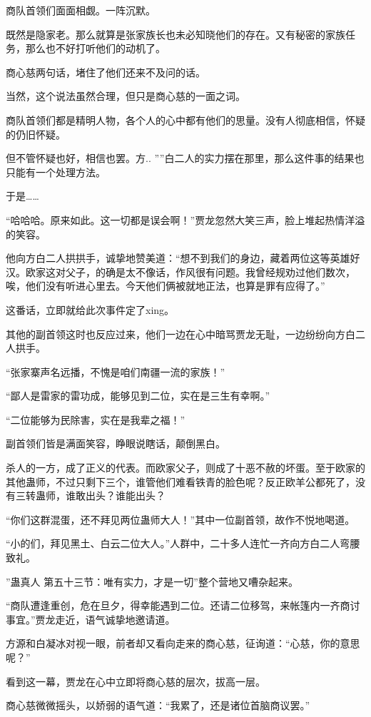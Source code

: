 \begin{this_body}
商队首领们面面相觑。一阵沉默。

既然是隐家老。那么就算是张家族长也未必知晓他们的存在。又有秘密的家族任务，那么也不好打听他们的动机了。

商心慈两句话，堵住了他们还来不及问的话。

当然，这个说法虽然合理，但只是商心慈的一面之词。

商队首领们都是精明人物，各个人的心中都有他们的思量。没有人彻底相信，怀疑的仍旧怀疑。

但不管怀疑也好，相信也罢。方.. ””白二人的实力摆在那里，那么这件事的结果也只能有一个处理方法。

于是……

“哈哈哈。原来如此。这一切都是误会啊！”贾龙忽然大笑三声，脸上堆起热情洋溢的笑容。

他向方白二人拱拱手，诚挚地赞美道：“想不到我们的身边，藏着两位这等英雄好汉。欧家这对父子，的确是太不像话，作风很有问题。我曾经规劝过他们数次，唉，他们没有听进心里去。今天他们俩被就地正法，也算是罪有应得了。”

这番话，立即就给此次事件定了xing。

其他的副首领这时也反应过来，他们一边在心中暗骂贾龙无耻，一边纷纷向方白二人拱手。

“张家寨声名远播，不愧是咱们南疆一流的家族！”

“鄙人是雷家的雷功成，能够见到二位，实在是三生有幸啊。”

“二位能够为民除害，实在是我辈之福！”

副首领们皆是满面笑容，睁眼说瞎话，颠倒黑白。

杀人的一方，成了正义的代表。而欧家父子，则成了十恶不赦的坏蛋。至于欧家的其他蛊师，不过只剩下三个，谁管他们难看铁青的脸色呢？反正欧羊公都死了，没有三转蛊师，谁敢出头？谁能出头？

“你们这群混蛋，还不拜见两位蛊师大人！”其中一位副首领，故作不悦地喝道。

“小的们，拜见黑土、白云二位大人。”人群中，二十多人连忙一齐向方白二人弯腰致礼。

”蛊真人 第五十三节：唯有实力，才是一切”整个营地又嘈杂起来。

“商队遭逢重创，危在旦夕，得幸能遇到二位。还请二位移驾，来帐篷内一齐商讨事宜。”贾龙走近，语气诚挚地邀请道。

方源和白凝冰对视一眼，前者却又看向走来的商心慈，征询道：“心慈，你的意思呢？”

看到这一幕，贾龙在心中立即将商心慈的层次，拔高一层。

商心慈微微摇头，以娇弱的语气道：“我累了，还是诸位首脑商议罢。”


\end{this_body}
